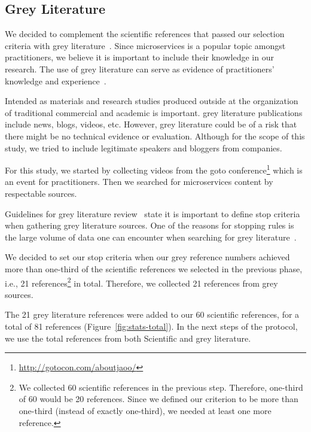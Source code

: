 \subsection{Grey Literature}

We decided to complement the scientific references that passed our selection criteria with grey literature~\cite{Garousi2016}. Since microservices is a popular topic amongst practitioners, we believe it is important to include their knowledge in our research. The use of grey literature can serve as evidence of practitioners' knowledge and experience~\cite{Kamei2019}.

Intended as materials and research studies produced outside at the organization of traditional commercial and academic is important. grey literature publications include news, blogs, videos, etc. However, grey literature could be of a risk that there might be no technical evidence or evaluation. Although for the scope of this study, we tried to include legitimate speakers and bloggers from companies.

For this study, we started by collecting videos from the goto conference\footnote{\url{http://gotocon.com/aboutjaoo/}} which is an event for practitioners. Then we searched for microservices content by respectable sources. 

Guidelines for grey literature review~\cite{Garousi2019} state it is important to define stop criteria when gathering grey literature sources. One of the reasons for stopping rules is the large volume of data one can encounter when searching for grey literature~\cite{Garousi2019}. 

We decided to set our stop criteria when our grey reference numbers achieved more than one-third of the scientific references we selected in the previous phase, i.e., 21 references\footnote{We collected 60 scientific references in the previous step. Therefore, one-third of 60 would be 20 references. Since we defined our criterion to be more than one-third (instead of exactly one-third), we needed at least one more reference.} in total. Therefore, we collected 21 references from grey sources.

The 21 grey literature references were added to our 60 scientific references, for a total of 81 references (Figure~\ref{fig:stats-total}). In the next steps of the protocol, we use the total references from both Scientific and grey literature.

